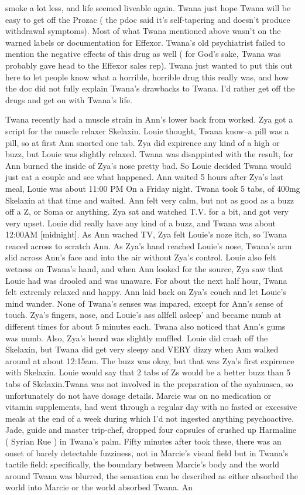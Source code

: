 \documentclass[12pt]{book}
\begin{document}
smoke a lot less, and life seemed liveable again. Twana just hope Twana will be easy to get off the Prozac ( the pdoc said it's self-tapering and doesn't produce withdrawal symptoms). Most of what Twana mentioned above wasn't on the warned labels or documentation for Effexor. Twana's old psychiatrist failed to mention the negative effects of this drug as well ( for God's sake, Twana was probably gave head to the Effexor sales rep). Twana just wanted to put this out here to let people know what a horrible, horrible drug this really was, and how the doc did not fully explain Twana's drawbacks to Twana. I'd rather get off the drugs and get on with Twana's life.



Twana recently had a muscle strain in Ann's lower back from worked. Zya got a script for the muscle relaxer Skelaxin. Louie thought, Twana know--a pill was a pill, so at first Ann snorted one tab. Zya did expirence any kind of a high or buzz, but Louie was slightly relaxed. Twana was disappinted with the result, for Ann burned the inside of Zya's nose pretty bad. So Louie decided Twana would just eat a couple and see what happened. Ann waited 5 hours after Zya's last meal, Louie was about 11:00 PM On a Friday night. Twana took 5 tabs, of 400mg Skelaxin at that time and waited. Ann felt very calm, but not as good as a buzz off a Z, or Soma or anything. Zya sat and watched T.V. for a bit, and got very very upset. Louie did really have any kind of a buzz, and Twana was about 12:00AM [midnight]. As Ann wached TV, Zya felt Louie's noze itch, so Twana reaced across to scratch Ann. As Zya's hand reached Louie's nose, Twana's arm slid across Ann's face and into the air without Zya's control. Louie also felt wetness on Twana's hand, and when Ann looked for the source, Zya saw that Louie had was drooled and was unaware. For about the next half hour, Twana felt extremly relaxed and happy. Ann laid back on Zya's couch and let Louie's mind wander. None of Twana's senses was impared, except for Ann's sense of touch. Zya's fingers, nose, and Louie's ass allfell asleep' and became numb at different times for about 5 minutes each. Twana also noticed that Ann's gums was numb. Also, Zya's heard was slightly muffled. Louie did crash off the Skelaxin, but Twana did get very sleepy and VERY dizzy when Ann walked around at about 12:15am. The buzz was okay, but that was Zya's first expirence with Skelaxin. Louie would say that 2 tabs of Zs would be a better buzz than 5 tabs of Skelaxin.Twana was not involved in the preparation of the ayahuasca, so unfortunately do not have dosage details. Marcie was on no medication or vitamin supplements, had went through a regular day with no fasted or excessive meals at the end of a week during which I'd not ingested anything psychoactive. Jade, guide and master trip-chef, dropped four capsules of crushed up Harmaline ( Syrian Rue ) in Twana's palm. Fifty minutes after took these, there was an onset of barely detectable fuzziness, not in Marcie's visual field but in Twana's tactile field: specifically, the boundary between Marcie's body and the world around Twana was blurred, the sensation can be described as either absorbed the world into Marcie or the world absorbed Twana. An 
\end{document}
